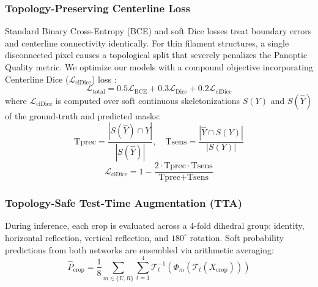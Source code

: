 \documentclass[sigconf]{acmart}
\begin{document}
\subsubsection{Topology-Preserving Centerline Loss}
Standard Binary Cross-Entropy (BCE) and soft Dice losses treat boundary errors and centerline connectivity identically. For thin filament structures, a single disconnected pixel causes a topological split that severely penalizes the Panoptic Quality metric. We optimize our models with a compound objective incorporating Centerline Dice ($\mathcal{L}_{\text{clDice}}$) loss \cite{shit2021cldice}:
\begin{equation}
\mathcal{L}_{\text{total}} = 0.5 \mathcal{L}_{\text{BCE}} + 0.3 \mathcal{L}_{\text{Dice}} + 0.2 \mathcal{L}_{\text{clDice}}
\end{equation}
where $\mathcal{L}_{\text{clDice}}$ is computed over soft continuous skeletonizations $S(Y)$ and $S(\hat{Y})$ of the ground-truth and predicted masks:
\begin{equation}
\text{Tprec} = \frac{|S(\hat{Y}) \cap Y|}{|S(\hat{Y})|}, \quad \text{Tsens} = \frac{|\hat{Y} \cap S(Y)|}{|S(Y)|}
\end{equation}
\begin{equation}
\mathcal{L}_{\text{clDice}} = 1 - \frac{2 \cdot \text{Tprec} \cdot \text{Tsens}}{\text{Tprec} + \text{Tsens}}
\end{equation}

\subsubsection{Topology-Safe Test-Time Augmentation (TTA)}
During inference, each crop is evaluated across a 4-fold dihedral group: identity, horizontal reflection, vertical reflection, and $180^\circ$ rotation. Soft probability predictions from both networks are ensembled via arithmetic averaging:
\begin{equation}
\hat{P}_{\text{crop}} = \frac{1}{8} \sum_{m \in \{E, R\}} \sum_{t=1}^4 \mathcal{T}_t^{-1} \left( \Phi_m(\mathcal{T}_t(X_{\text{crop}})) \right)
\end{equation}
\end{document}

